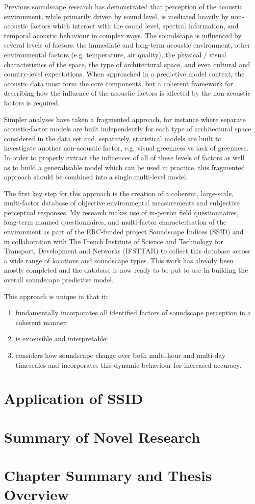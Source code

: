     Previous soundscape research has demonstrated that perception of the acoustic environment, while primarily driven by sound level, is mediated heavily by non-acoustic factors which interact with the sound level, spectral information, and temporal acoustic behaviour in complex ways. The soundscape is influenced by several levels of factors: the immediate and long-term acoustic environment, other environmental factors (e.g. temperature, air quality), the physical / visual characteristics of the space, the type of architectural space, and even cultural and country-level expectations. When approached in a predictive model context, the acoustic data must form the core components, but a coherent framework for describing how the influence of the acoustic factors is affected by the non-acoustic factors is required.

    Simpler analyses have taken a fragmented approach, for instance where separate acoustic-factor models are built independently for each type of architectural space considered in the data set and, separately, statistical models are built to investigate another non-acoustic factor, e.g. visual greenness vs lack of greenness. In order to properly extract the influences of all of these levels of factors as well as to build a generalisable model which can be used in practice, this fragmented approach should be combined into a single multi-level model.

    The first key step for this approach is the creation of a coherent, large-scale, multi-factor database of objective environmental measurements and subjective perceptual responses. My research makes use of in-person field questionnaires, long-term manned questionnaires, and multi-factor characterisation of the environment as part of the ERC-funded project Soundscape Indices (SSID) and in collaboration with The French Institute of Science and Technology for Transport, Development and Networks (IFSTTAR) to collect this database across a wide range of locations and soundscape types. This work has already been mostly completed and the database is now ready to be put to use in building the overall soundscape predictive model.

    This approach is unique in that it:
    \begin{enumerate}
      \item fundamentally incorporates all identified factors of soundscape perception in a coherent manner;
      \item is extensible and interpretable;
      \item considers how soundscape change over both multi-hour and multi-day timescales and incorporates this dynamic behaviour for increased accuracy.
    \end{enumerate}

\section{Application of SSID}

\section{Summary of Novel Research}

\section{Chapter Summary and Thesis Overview}
